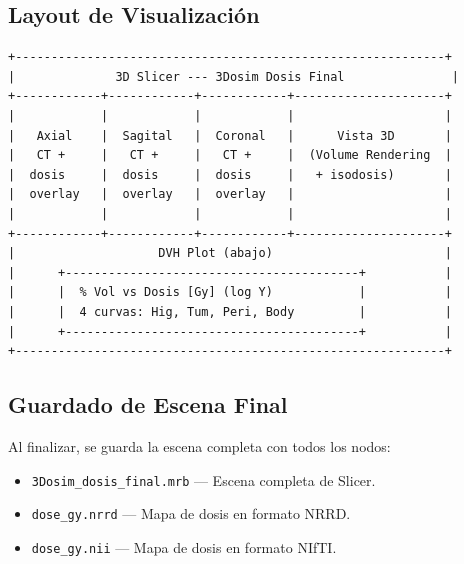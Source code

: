 \documentclass[12pt,a4paper]{article}
\begin{document}
\subsection{Layout de Visualización}

\begin{lstlisting}
+------------------------------------------------------------+
|              3D Slicer --- 3Dosim Dosis Final               |
+------------+------------+------------+---------------------+
|            |            |            |                     |
|   Axial    |  Sagital   |  Coronal   |      Vista 3D       |
|   CT +     |   CT +     |   CT +     |  (Volume Rendering  |
|  dosis     |  dosis     |  dosis     |   + isodosis)       |
|  overlay   |  overlay   |  overlay   |                     |
|            |            |            |                     |
+------------+------------+------------+---------------------+
|                    DVH Plot (abajo)                        |
|      +-----------------------------------------+           |
|      |  % Vol vs Dosis [Gy] (log Y)            |           |
|      |  4 curvas: Hig, Tum, Peri, Body         |           |
|      +-----------------------------------------+           |
+------------------------------------------------------------+
\end{lstlisting}

\subsection{Guardado de Escena Final}

Al finalizar, se guarda la escena completa con todos los nodos:

\begin{itemize}
  \item \texttt{3Dosim\_dosis\_final.mrb} --- Escena completa de Slicer.
  \item \texttt{dose\_gy.nrrd} --- Mapa de dosis en formato NRRD.
  \item \texttt{dose\_gy.nii} --- Mapa de dosis en formato NIfTI.
\end{itemize}
\end{document}

